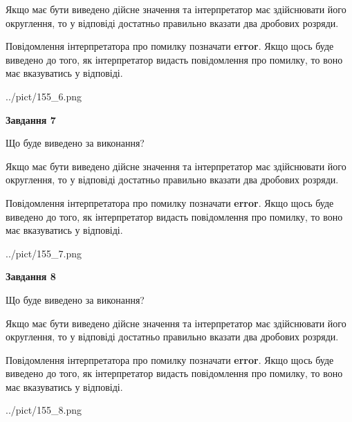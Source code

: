\documentclass[12pt, ukrainian]{article}
\begin{document}
{\begin {Large}
Якщо має бути виведено дійсне значення та інтерпретатор має здійснювати його округлення, 
то у відповіді достатньо правильно вказати два дробових розряди.

Повідомлення інтерпретатора про помилку позначати \textbf{error}.
Якщо щось буде виведено до того, як інтерпретатор видасть повідомлення про помилку, 
то воно має вказуватись у відповіді. \par

\begin{center}
	{../pict/155_6.png}
\end{center}
\newpage

{\begin {center}\textbf{Завдання 7}\end {center}}\par
Що буде виведено за виконання? \par

Якщо має бути виведено дійсне значення та інтерпретатор має здійснювати його округлення, 
то у відповіді достатньо правильно вказати два дробових розряди.

Повідомлення інтерпретатора про помилку позначати \textbf{error}.
Якщо щось буде виведено до того, як інтерпретатор видасть повідомлення про помилку, 
то воно має вказуватись у відповіді. \par

\begin{center}
	{../pict/155_7.png}
\end{center}
\newpage

{\begin {center}\textbf{Завдання 8}\end {center}}\par
Що буде виведено за виконання? \par

Якщо має бути виведено дійсне значення та інтерпретатор має здійснювати його округлення, 
то у відповіді достатньо правильно вказати два дробових розряди.

Повідомлення інтерпретатора про помилку позначати \textbf{error}.
Якщо щось буде виведено до того, як інтерпретатор видасть повідомлення про помилку, 
то воно має вказуватись у відповіді. \par

\begin{center}
	{../pict/155_8.png}
\end{center}
\newpage


\end{Large}}
\end{document}
